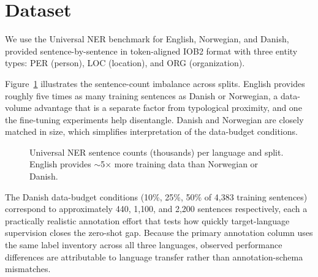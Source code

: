\section{Dataset}

We use the Universal NER benchmark \citep{mayhew2024universal} for English, Norwegian, and Danish, provided sentence-by-sentence in token-aligned IOB2 format with three entity types: PER (person), LOC (location), and ORG (organization).

Figure~\ref{fig:dataset_splits} illustrates the sentence-count imbalance across splits. English provides roughly five times as many training sentences as Danish or Norwegian, a data-volume advantage that is a separate factor from typological proximity, and one the fine-tuning experiments help disentangle. Danish and Norwegian are closely matched in size, which simplifies interpretation of the data-budget conditions.

\begin{figure}[t]
\centering
{}
\caption{Universal NER sentence counts (thousands) per language and split. English provides $\sim$5$\times$ more training data than Norwegian or Danish.}
\label{fig:dataset_splits}
\end{figure}

The Danish data-budget conditions (10\%, 25\%, 50\% of 4{,}383 training sentences) correspond to approximately 440, 1{,}100, and 2{,}200 sentences respectively, each a practically realistic annotation effort that tests how quickly target-language supervision closes the zero-shot gap. Because the primary annotation column uses the same label inventory across all three languages, observed performance differences are attributable to language transfer rather than annotation-schema mismatches.
